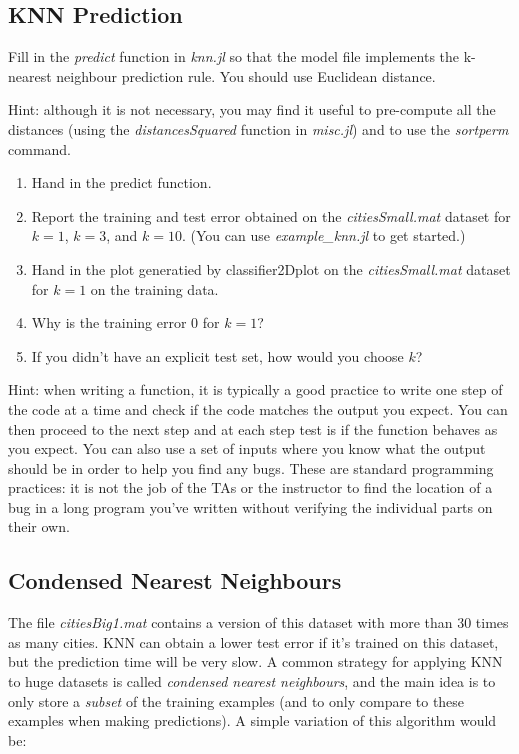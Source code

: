 \documentclass{article}
\def\blu#1{{\color{blu}#1}}
\def\enum#1{\begin{enumerate}#1\end{enumerate}}
\begin{document}
\subsection{KNN Prediction}

Fill in the \emph{predict} function in \emph{knn.jl} so that the model file implements the k-nearest neighbour prediction rule. You should use Euclidean distance. 

Hint: although it is not necessary, you may find it useful to pre-compute all the distances (using the \emph{distancesSquared} function in \emph{misc.jl}) and to use the \emph{sortperm} command.
\blu{
\enum{
\item Hand in the predict function. 
\item Report  the training and test error obtained on the \emph{citiesSmall.mat} dataset for $k=1$, $k=3$, and $k=10$. (You can use \emph{example\_knn.jl} to get started.)
\item Hand in the plot generatied by {classifier2Dplot} on the \emph{citiesSmall.mat} dataset for $k=1$ on the training data. \item Why is the training error $0$ for $k=1$?
\item If you didn't have an explicit test set, how would you choose $k$?
}
}

Hint: when writing a function, it is typically a good practice to write one step of the code at a time and check if the code matches the output you expect. You can then proceed to the next step and at each step test is if the function behaves as you expect. You can also use a set of inputs where you know what the output should be in order to help you find any bugs. These are standard programming practices: it is not the job of the TAs or the instructor to find the location of a bug in a long program you've written without verifying the individual parts on their own.

\subsection{Condensed Nearest Neighbours}

The file \emph{citiesBig1.mat} contains a version of this dataset with more than 30 times as many cities. KNN can obtain a lower test error if it's trained on this dataset, but the prediction time will be very slow. A common strategy for applying KNN to huge datasets is called \emph{condensed nearest neighbours}, and the main idea is to only store a \emph{subset} of the training examples (and to only compare to these examples when making predictions). A simple variation of this algorithm would be:
\end{document}
